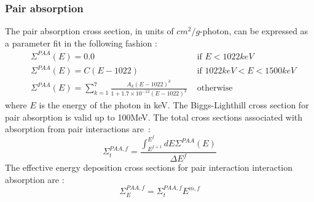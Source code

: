 \subsubsection{Pair absorption}
The pair absorption cross section, in units of $cm^2/g$-photon, can be
expressed as a parameter fit in the following fashion :
\begin{align}
& \Sigma^{PAA}(E) = 0.0 & \textrm{ if } E<1022keV\\
& \Sigma^{PAA}(E) = C (E-1022) & \textrm{ if } 1022keV < E < 1500 keV\\
& \Sigma^{PAA}(E) = \sum_{k=1}^7 \frac{A_k (E-1022)^k}{1+1.7\times
10^{-13}(E-1022)^3} & \textrm{ otherwise}
\end{align}
where $E$ is the energy of the photon in keV. The Biggs-Lighthill cross
section for pair absorption is valid up to 100MeV.
The total cross sections associated with absorption from pair interactions
\hbox{are :}
\begin{equation}
\Sigma_t^{PAA,f} = \frac{\int_{E^{f+1}}^{E^f} dE \Sigma^{PAA}(E)}{\Delta E^f}
\end{equation}
The effective energy deposition cross sections for pair interaction
interaction absorption are :
\begin{equation}
\Sigma_E^{PAA,f} = \Sigma_t^{PAA,f} E^{m,f}
\end{equation}

